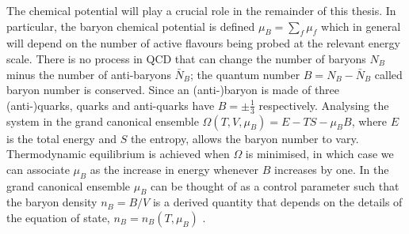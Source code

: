 \documentclass[11pt, a4paper, twoside]{book}
\newcommand{\brac}[1] {\!\left(#1\right)}
\begin{document}
The chemical potential will play a crucial role in the remainder of this thesis. In particular, the baryon chemical potential is defined \(\mu_B=\sum_f \mu_f\) which in general will depend on the number of active flavours being probed at the relevant energy scale. There is no process in QCD that can change the number of baryons \(N_B\) minus the number of anti-baryons \(\bar{N}_B\); the quantum number \(B=N_B-\bar{N}_B\) called baryon number is conserved. Since an (anti-)baryon is made of three (anti-)quarks, quarks and anti-quarks have \(B=\pm\frac{1}{3}\) respectively. Analysing the system in the grand canonical ensemble \(\Omega\brac{T,V,\mu_B}=E-TS-\mu_BB\), where \(E\) is the total energy and \(S\) the entropy, allows the baryon number to vary. Thermodynamic equilibrium is achieved when \(\Omega\) is minimised, in which case we can associate \(\mu_B\) as the increase in energy whenever \(B\) increases by one. In the grand canonical ensemble \(\mu_B\) can be thought of as a control parameter such that the baryon density \(n_B=B/V\) is a derived quantity that depends on the details of the equation of state, \(n_B=n_B\brac{T,\mu_B}\) \cite{2001ConPh..42..209H}. 
\end{document}
